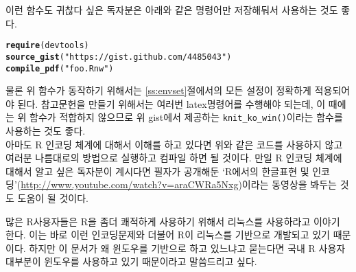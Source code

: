 \documentclass[11pt]{article}\usepackage{graphicx, color}
\makeatletter
\newcommand{\hlfunctioncall}[1]{\textcolor[rgb]{0.501960784313725,0,0.329411764705882}{\textbf{#1}}}%
\newcommand{\hlstring}[1]{\textcolor[rgb]{0.6,0.6,1}{#1}}%
\newenvironment{kframe}{%
 \def\at@end@of@kframe{}%
 \ifinner\ifhmode%
  \def\at@end@of@kframe{\end{minipage}}%
  \begin{minipage}{\columnwidth}%
 \fi\fi%
 \def\FrameCommand##1{\hskip\@totalleftmargin \hskip-\fboxsep
 \colorbox{shadecolor}{##1}\hskip-\fboxsep
     \hskip-\linewidth \hskip-\@totalleftmargin \hskip\columnwidth}%
 \MakeFramed {\advance\hsize-\width
   \@totalleftmargin\z@ \linewidth\hsize
   \@setminipage}}%
 {\par\unskip\endMakeFramed%
 \at@end@of@kframe}
\newenvironment{knitrout}{}{} %
\makeatother
\begin{document}
이런 함수도 귀찮다 싶은 독자분은 아래와 같은 명령어만 저장해둬서 사용하는 것도 좋다.

\begin{knitrout}
\color{fgcolor}\begin{kframe}
\begin{alltt}
\hlfunctioncall{require}(devtools)
\hlfunctioncall{source_gist}(\hlstring{"https://gist.github.com/4485043"})
\hlfunctioncall{compile_pdf}(\hlstring{"foo.Rnw"})
\end{alltt}
\end{kframe}
\end{knitrout}


물론 위 함수가 동작하기 위해서는 \ref{ss:envset}절에서의 모든 설정이 정확하게 적용되어야 된다. 참고문헌을 만들기 위해서는 여러번 latex명령어를 수행해야 되는데, 이 때에는 위 함수가 적합하지 않으므로 위 gist에서 제공하는 \verb|knit_ko_win()|이라는 함수를 사용하는 것도 좋다. 
\\
아마도 R 인코딩 체계에 대해서 이해를 하고 있다면 위와 같은 코드를 사용하지 않고 여러분 나름대로의 방법으로 실행하고 컴파일 하면 될 것이다. 만일 R 인코딩 체계에 대해서 알고 싶은 독자분이 계시다면 필자가 공개해둔 `R에서의 한글표현 및 인코딩'(\url{http://www.youtube.com/watch?v=araCWRa5Nxg})이라는 동영상을 봐두는 것도 도움이 될 것이다. 

많은 R사용자들은 R을 좀더 쾌적하게 사용하기 위해서 리눅스를 사용하라고 이야기 한다. 이는 바로 이런 인코딩문제와 더불어 R이 리눅스를 기반으로 개발되고 있기 때문이다. 하지만 이 문서가 왜 윈도우를 기반으로 하고 있느냐고 묻는다면 국내 R 사용자 대부분이 윈도우를 사용하고 있기 때문이라고 말씀드리고 싶다. 






\end{document}
